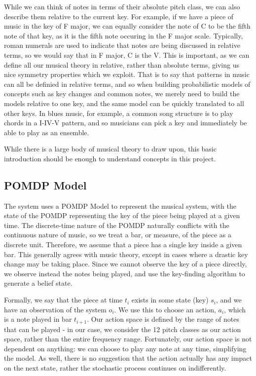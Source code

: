 \documentclass[11pt]{article} %
\begin{document}
While we can think of notes in terms of their absolute pitch class, we can also describe them relative to the current key. For example, if we have a piece of music in the key of F major, we can equally consider the note of C to be the fifth note of that key, as it is the fifth note occuring in the F major scale. Typically, roman numerals are used to indicate that notes are being discussed in relative terms, so we would say that in F major, C is the V. This is important, as we can define all our musical theory in relative, rather than absolute terms, giving us nice symmetry properties which we exploit. That is to say that patterns in music can all be definied in relative terms, and so when building probabilistic models of concepts such as key changes and common notes, we merely need to build the models relative to one key, and the same model can be quickly translated to all other keys. In blues music, for example, a common song structure is to play chords in a I-IV-V pattern, and so musicians can pick a key and immediately be able to play as an ensemble.

While there is a large body of musical theory to draw upon, this basic introduction should be enough to understand concepts in this project.
\subsection{POMDP Model}

The system uses a POMDP Model to represent the musical system, with the state of the POMDP representing the key of the piece being played at a given time. The discrete-time nature of the POMDP naturally conflicts with the continuous nature of music, so we treat a bar, or measure, of the piece as a discrete unit. Therefore, we assume that a piece has a single key inside a given bar. This generally agrees with music theory, except in cases where a drastic key change may be taking place. Since we cannot observe the key of a piece directly, we observe instead the notes being played, and use the key-finding algorithm to generate a belief state. 

Formally, we say that the piece at time $t_i$ exists in some state (key) $s_i$, and we have an observation of the system $o_i$. We use this to choose an action, $a_i$, which is a note played in bar $t_{i+1}$. Our action space is defined by the range of notes that can be played - in our case, we consider the 12 pitch classes as our action space, rather than the entire frequency range. Fortunately, our action space is not dependent on anything: we can choose to play any note at any time, simplifying the model. As well, there is no suggestion that the action actually has any impact on the next state, rather the stochastic process continues on indifferently. 
\end{document}
